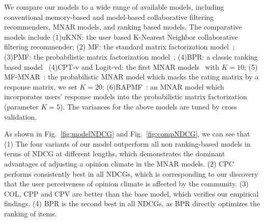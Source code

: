 \documentclass{sig-alternate}
\begin{document}
We compare our models to a wide range of available models, including conventional memory-based and model-based collaborative filtering recommenders, MNAR models, and ranking based models. The comparative models include (1)uKNN: the user based K-Nearest Neighbor collaborative filtering recommender; (2) MF: the standard matrix factorization model~\cite{Koren2009Matrix}; (3)PMF: the probabilistic matrix factorization model~\cite{salakhutdinov2008probabilistic}; (4)BPR: a classic ranking based model~\cite{Rendle2009Bayesian} (4)CPT-v and Logit-vd: the first MNAR models~\cite{Marlin2009Collaborative} with $K=10$; (5) MF-MNAR~\cite{Hernandez-Lobato2014Probabilistic}: the probabilistic MNAR model which masks the rating matrix by a response matrix, we set $K=20$; (6)RAPMF~\cite{Yang2015Boosting}: an MNAR model which incorporates users' response models into the probabilistic matrix factorization (parameter $K=5$). The variances for the above models are tuned by cross validation.

As shown in Fig.~\ref{fig:modelNDCG} and Fig.~\ref{fig:compNDCG}, we can see that (1) The four variants of our model outperform all non ranking-based models in terms of NDCG at different lengths, which demonstrates the dominant advantages of adjusting a opinion climate in the MNAR models.  (2) CPC performs consistently best in all NDCGs, which is corresponding to our discovery that the user perceiveness of opinion climate is affected by the community. (3) COL, CPP and CPV are better than the base model, which verifies our empirical findings. (4) BPR is the second best in all NDCGs, as BPR directly optimizes the ranking of items.   
\end{document}
